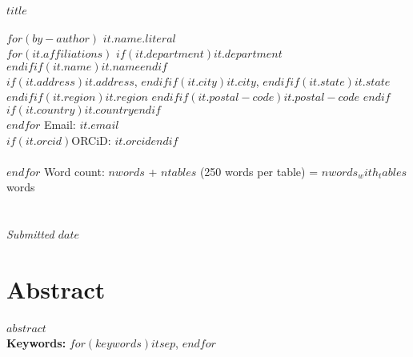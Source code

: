 \thispagestyle{empty}\noindent\textbf{$title$}\\%
\\%
$for(by-author)$
    \textbf{$it.name.literal$}\\%
    $for(it.affiliations)$
        $if(it.department)$$it.department$\\%
        $endif$$if(it.name)$$it.name$$endif$\\%
        $if(it.address)$$it.address$, $endif$$if(it.city)$$it.city$, $endif$$if(it.state)$$it.state$ $endif$$if(it.region)$$it.region$ $endif$$if(it.postal-code)$$it.postal-code$ $endif$$if(it.country)$$it.country$$endif$\\%
    $endfor$
    Email: \href{mailto:$it.email$}{$it.email$}\\%
    $if(it.orcid)$ORCiD: \href{https://orcid.org/$it.orcid$}{$it.orcid$}$endif$\\%
    \\%
$endfor$
Word count: $nwords$ + $ntables$ (250 words per table) = $nwords_with_tables$ words\\%
\\%
\\%
\textit{Submitted $date$}
\fancyhead[R]{}
\newpage

\section*{Abstract}

$abstract$~\\%
\textbf{Keywords:} $for(keywords)$$it$$sep$, $endfor$

\newpage